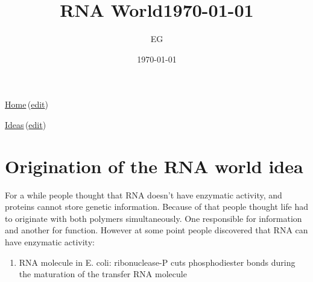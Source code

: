 \documentclass[12pt]{paper}
\title{RNA World\today}
\author{EG}
\date{\today}
\newcommand{\wikilink}[2] { \href{#1.pdf}{#2}\,(\href{#1.tex}{edit})}
\begin{document}
 \maketitle
\wikilink{home}{Home}

\wikilink{ideas}{Ideas}

\section{Origination of the RNA world idea}
For a while people thought that RNA doesn't have enzymatic activity, and proteins cannot store 
genetic information. Because of that people thought life had to originate with both polymers 
simultaneously. One responsible for information and another for function. However at some point 
people discovered that RNA can have enzymatic activity:\
\begin{enumerate}
 \item RNA molecule in E. coli: ribonuclease-P cuts phosphodiester bonds during the maturation of 
the transfer RNA molecule\cite{Guerrier-Takada1983,Guerrier-Takada1984}
\end{enumerate}



  
   
\end{document}
